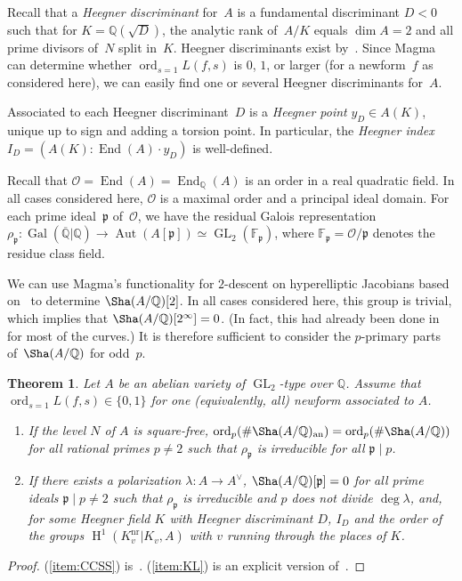 \documentclass{amsart}
\newtheorem{theorem}{Theorem}
\newcommand{\Q}{{\mathbb{Q}}}
\newcommand{\Qbar}{{\overline{\Q}}}
\newcommand{\F}{{\mathbb{F}}}
\newcommand{\pfr}{{\mathfrak{p}}}
\newcommand{\End}{\operatorname{End}}
\newcommand{\Aut}{\operatorname{Aut}}
\newcommand{\GL}{\operatorname{GL}}
\newcommand{\Gal}{\operatorname{Gal}}
\newcommand{\GalQ}{{\Gal(\Qbar|\Q)}}
\renewcommand{\H}{{\operatorname{H}}}
\newcommand{\Ocal}{{\mathcal{O}}}
\newcommand{\an}{{\mathrm{an}}}
\newcommand{\nr}{{\mathrm{nr}}}
\newcommand{\ord}{\operatorname{ord}}
\begin{document}
	Recall that a \emph{Heegner discriminant} for~$A$ is a fundamental discriminant
	$D < 0$ such that for $K = \Q(\sqrt{D})$, the analytic rank of~$A/K$ equals
	$\dim A = 2$ and all prime divisors of~$N$ split in~$K$. Heegner discriminants exist
	by~\cite{BFH1989,Waldspurger1985}. Since Magma can determine whether
	$\ord_{s=1} L(f, s)$ is $0$, $1$, or larger (for a newform~$f$ as considered
	here), we can easily find one or several Heegner discriminants for~$A$.
	
	Associated to each Heegner discriminant~$D$ is a \emph{Heegner point}
	$y_D \in A(K)$, unique up to sign and adding a torsion point.
	In particular, the \emph{Heegner index} $I_D = (A(K) : \End(A) \cdot y_D)$
	is well-defined.
	
	Recall that $\Ocal = \End(A) = \End_{\Q}(A)$ is an order in a real quadratic field.
	In all cases considered here, $\Ocal$ is a maximal order and a principal ideal domain.
	For each prime ideal~$\pfr$ of~$\Ocal$, we have the residual Galois
	representation $\rho_\pfr \colon \GalQ \to \Aut(A[\pfr]) \simeq \GL_2(\F_\pfr)$,
	where $\F_\pfr = \Ocal/\pfr$ denotes the residue class field.
	
	We can use Magma's functionality for $2$-descent on hyperelliptic
	Jacobians based on~\cite{Stoll2001} to determine $\Sha(A/\Q)[2]$.
	In all cases considered here,
	this group is trivial, which implies that $\Sha(A/\Q)[2^\infty] = 0$.
	(In fact, this had already been done in~\cite{FLSSSW} for most of the curves.)
	It is therefore sufficient to consider the $p$-primary parts of~$\Sha(A/\Q)$
	for odd~$p$.
	
	\begin{theorem}\label{th:main}
		Let $A$ be an abelian variety of $\GL_2$-type over $\Q$. Assume that $\ord_{s=1} L(f,s) \in \{0,1\}$ for one (equivalently, all) newform associated to $A$.
		\begin{enumerate}
			\item \label{item:CCSS} If the level $N$ of $A$ is square-free, $\ord_p(\#\Sha(A/\Q)_\an) = \ord_p(\#\Sha(A/\Q))$ for all rational primes $p \neq 2$ such that $\rho_\pfr$ is irreducible for all $\pfr \mid p$.
			
			\item \label{item:KL} If there exists a polarization $\lambda: A \to A^\vee$, $\Sha(A/\Q)[\pfr] = 0$ for all prime ideals $\pfr \mid p \neq 2$ such that $\rho_\pfr$ is irreducible and $p$ does not divide $\deg\lambda$, and, for some Heegner field $K$ with Heegner discriminant $D$, $I_D$ and the order of the groups $\H^1(K_v^\nr|K_v,A)$ with $v$ running through the places of $K$.
		\end{enumerate}
	\end{theorem}
	\begin{proof}
		(\ref{item:CCSS}) is~\cite[Theorems~C and~D]{CCSS}. (\ref{item:KL}) is an explicit version of~\cite{KolyvaginLogachev}.
	\end{proof}
	
\end{document}
